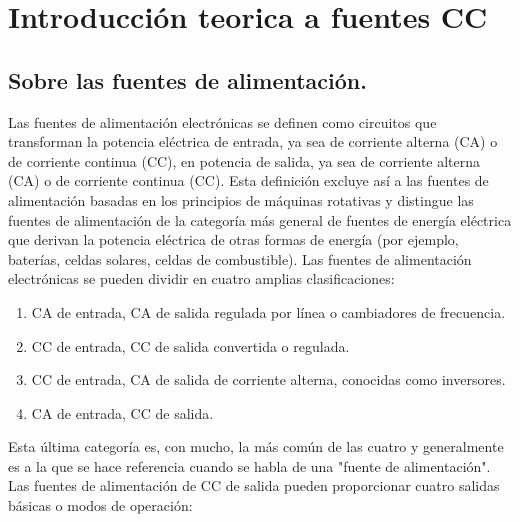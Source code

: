 \chapter{Introducción teorica a fuentes CC}

\label{C:Fuentes de corriente continua}

\section{Sobre las fuentes de alimentación.} \par
Las fuentes de alimentación electrónicas se definen como circuitos que transforman la potencia eléctrica de entrada, ya sea de corriente alterna (CA) o de corriente continua (CC), en potencia de salida, ya sea de corriente alterna (CA) o de corriente continua (CC). Esta definición excluye así a las fuentes de alimentación basadas en los principios de máquinas rotativas y distingue las fuentes de alimentación de la categoría más general de fuentes de energía eléctrica que derivan la potencia eléctrica de otras formas de energía (por ejemplo, baterías, celdas solares, celdas de combustible). Las fuentes de alimentación electrónicas se pueden dividir en cuatro amplias clasificaciones:

\begin{enumerate}
    \item CA de entrada, CA de salida regulada por línea o cambiadores de frecuencia.
    \item CC de entrada, CC de salida convertida o regulada.
    \item CC de entrada, CA de salida de corriente alterna, conocidas como inversores.
    \item CA de entrada, CC de salida.
\end{enumerate}

Esta última categoría es, con mucho, la más común de las cuatro y generalmente es a la que se hace referencia cuando se habla de una "fuente de alimentación". Las fuentes de alimentación de CC de salida pueden proporcionar cuatro salidas básicas o modos de operación:

